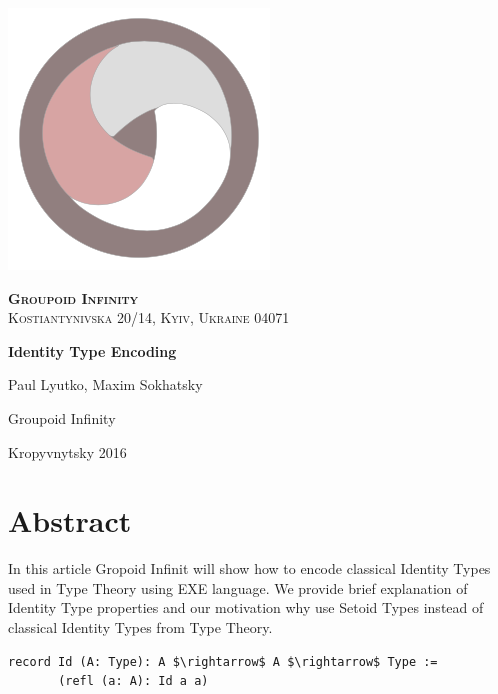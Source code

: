 \documentclass[11pt,oneside]{article}
\begin{document}
\thispagestyle{empty}
\begin{center}

\begingroup
\parbox[t][][l]{0.30\textwidth}{ \includegraphics[scale=0.3]{img/grp} }
\parbox[t][][r]{0.60\textwidth}{ \flushright \textsc{{\Large {\bf {Groupoid Infinity}}}}\\
                                             \textsc{Kostiantynivska 20/14, Kyiv, Ukraine 04071}\\  }\endgroup

\vspace{6cm}   {\Large \bf Identity Type Encoding\\}\par
\vspace{0.3cm} {\Large Paul Lyutko, Maxim Sokhatsky\par}
\vspace{6cm}   {\Large Groupoid Infinity\par}
\vspace{0.3cm} {\Large Kropyvnytsky 2016}

\end{center}

\newpage
\vspace{2cm}
\tableofcontents
\newpage

\section{Abstract}

In this article Gropoid Infinit will show how to encode classical
Identity Types used in Type Theory using EXE language. We provide brief explanation
of Identity Type properties and our motivation why use Setoid Types instead
of classical Identity Types from Type Theory.

\begin{lstlisting}[mathescape=true]
record Id (A: Type): A $\rightarrow$ A $\rightarrow$ Type :=
       (refl (a: A): Id a a)
\end{lstlisting}
\end{document}
